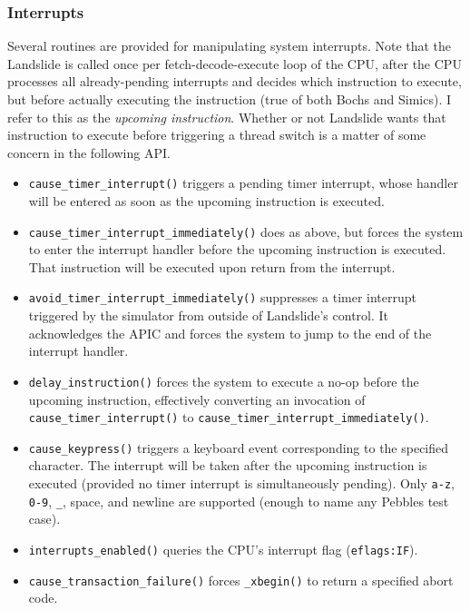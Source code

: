 \subsubsection{Interrupts}
\label{sec:landslide-interrupce}

Several routines are provided for manipulating system interrupts.
Note that the Landslide is called once per fetch-decode-execute loop of the CPU,
after the CPU processes all already-pending interrupts and decides which instruction to execute,
but before actually executing the instruction
(true of both Bochs and Simics).
I refer to this as the {\em upcoming instruction}.
Whether or not Landslide wants that instruction to execute before triggering a thread switch is a matter of some concern in the following API.

\begin{itemize}
	\item {\tt cause\_timer\_interrupt()}
		triggers a pending timer interrupt, whose handler will be entered as soon as the upcoming instruction is executed.
	\item {\tt cause\_timer\_interrupt\_immediately()}
		does as above, but forces the system to enter the interrupt handler before the upcoming instruction is executed.
		That instruction will be executed upon return from the interrupt.
	\item {\tt avoid\_timer\_interrupt\_immediately()}
		suppresses a timer interrupt triggered by the simulator from outside of Landslide's control.
		It acknowledges the APIC and forces the system to jump to the end of the interrupt handler.
	\item {\tt delay\_instruction()}
		forces the system to execute a no-op before the upcoming instruction,
		effectively converting an invocation of {\tt cause\_timer\_interrupt()} to {\tt cause\_timer\_interrupt\_immediately()}.
	\item {\tt cause\_keypress()} triggers a keyboard event corresponding to the specified character.
		The interrupt will be taken after the upcoming instruction is executed
		(provided no timer interrupt is simultaneously pending).
		Only {\tt a-z}, {\tt 0-9}, {\tt \_}, space, and newline are supported (enough to name any Pebbles test case).
	\item {\tt interrupts\_enabled()} queries the CPU's interrupt flag ({\tt eflags:IF}).
	\item {\tt cause\_transaction\_failure()} forces {\tt \_xbegin()} to return a specified abort code.
\end{itemize}

